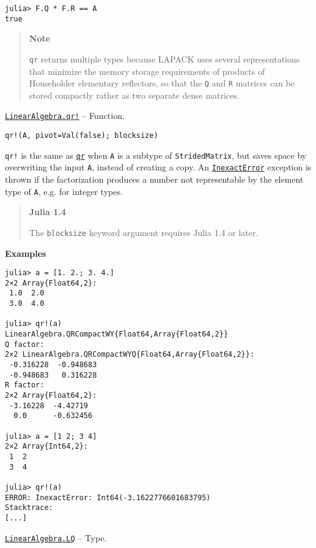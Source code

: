 \begin{adjustwidth}{2em}{0pt}
\begin{verbatim}
julia> F.Q * F.R == A
true
\end{verbatim}

\begin{quote}
\textbf{Note}

\texttt{qr} returns multiple types because LAPACK uses several representations that minimize the memory storage requirements of products of Householder elementary reflectors, so that the \texttt{Q} and \texttt{R} matrices can be stored compactly rather as two separate dense matrices.

\end{quote}


\end{adjustwidth}
\hypertarget{9968830575998743150}{} 
\hyperlink{9968830575998743150}{\texttt{LinearAlgebra.qr!}}  -- {Function.}

\begin{adjustwidth}{2em}{0pt}


\begin{verbatim}
qr!(A, pivot=Val(false); blocksize)
\end{verbatim}

\texttt{qr!} is the same as \hyperlink{4122539696772350360}{\texttt{qr}} when \texttt{A} is a subtype of \texttt{StridedMatrix}, but saves space by overwriting the input \texttt{A}, instead of creating a copy. An \hyperlink{5399118524830636312}{\texttt{InexactError}} exception is thrown if the factorization produces a number not representable by the element type of \texttt{A}, e.g. for integer types.

\begin{quote}
\textbf{Julia 1.4}

The \texttt{blocksize} keyword argument requires Julia 1.4 or later.

\end{quote}
\textbf{Examples}


\begin{verbatim}
julia> a = [1. 2.; 3. 4.]
2×2 Array{Float64,2}:
 1.0  2.0
 3.0  4.0

julia> qr!(a)
LinearAlgebra.QRCompactWY{Float64,Array{Float64,2}}
Q factor:
2×2 LinearAlgebra.QRCompactWYQ{Float64,Array{Float64,2}}:
 -0.316228  -0.948683
 -0.948683   0.316228
R factor:
2×2 Array{Float64,2}:
 -3.16228  -4.42719
  0.0      -0.632456

julia> a = [1 2; 3 4]
2×2 Array{Int64,2}:
 1  2
 3  4

julia> qr!(a)
ERROR: InexactError: Int64(-3.1622776601683795)
Stacktrace:
[...]
\end{verbatim}



\end{adjustwidth}
\hypertarget{15372856222060015568}{} 
\hyperlink{15372856222060015568}{\texttt{LinearAlgebra.LQ}}  -- {Type.}

